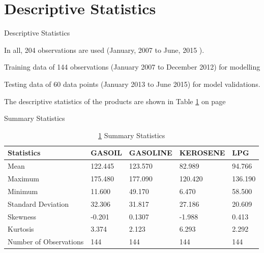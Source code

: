 \documentclass{beamer}
\newcommand{\startDate}{January, 2007 }
\newcommand{\finishDate}{June, 2015 }
\newcommand{\numOfObservations}{204 }
\begin{document}
	\section{Descriptive Statistics}
	\begin{frame}{Descriptive Statistics}
		\begin{block}{}
			\vspace{4pt}
			In all, \numOfObservations observations are used (\startDate to \finishDate). \vspace{4pt}
		\end{block} \vspace{5pt}
		
		\begin{block}{}
		Training data of 144 observations (January 2007 to December 2012) for modelling \\ \vspace{5pt}
		
		Testing data of 60 data points (January 2013 to June 2015) for model validations.
		\end{block} \vspace{5pt}
	
		\begin{block}{}
			The descriptive statistics of the products are shown in Table \ref{table:description} on page \pageref{table:description}
		\end{block}
	\end{frame}
	
	\begin{frame}{Summary Statistics}
		\begin{table}[]
			\caption{ \ref{table:description} Summary Statistics}
			\begin{tabular}{lllll}
\hline
Statistics             & GASOIL  & GASOLINE & KEROSENE & LPG     \\ \hline
Mean                   & 122.445 & 123.570  & 82.989   & 94.766  \\
Maximum                & 175.480 & 177.090  & 120.420  & 136.190 \\
Minimum                & 11.600  & 49.170   & 6.470    & 58.500  \\
Standard Deviation     & 32.306  & 31.817   & 27.186   & 20.609  \\ 
Skewness               & -0.201  & 0.1307   & -1.988   & 0.413   \\
Kurtosis               & 3.374   & 2.123    & 6.293    & 2.292   \\
Number of Observations & 144     & 144      & 144      & 144     \\ \hline
			\end{tabular}
			\label{table:description}
		\end{table}
	\end{frame}
\end{document}
